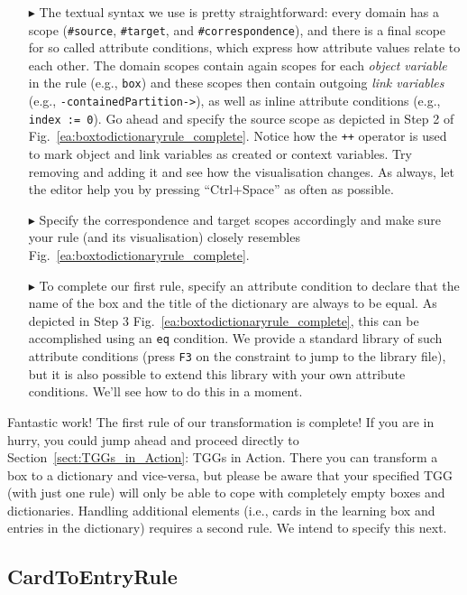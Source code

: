 \begin{enumerate}
\item[$\blacktriangleright$] The textual syntax we use is pretty straightforward:  every domain has a scope (\texttt{\#source}, \texttt{\#target}, and \texttt{\#correspondence}), and there is a final scope for so called attribute conditions, which express how attribute values relate to each other.
The domain scopes contain again scopes for each \emph{object variable} in the rule (e.g., \texttt{box}) and these scopes then contain outgoing \emph{link variables} (e.g., \texttt{-contained\-Partition->}), as well as inline attribute conditions (e.g., \texttt{index := 0}).
Go ahead and specify the source scope as depicted in Step 2 of Fig.~\ref{ea:boxtodictionaryrule_complete}.
Notice how the \texttt{++} operator is used to mark object and link variables as created or context variables.
Try removing and adding it and see how the visualisation changes.  
As always, let the editor help you by pressing ``Ctrl+Space'' as often as possible.

\item[$\blacktriangleright$] Specify the correspondence and target scopes accordingly and make sure your rule (and its visualisation) closely resembles Fig.~\ref{ea:boxtodictionaryrule_complete}.

\item[$\blacktriangleright$] To complete our first rule, specify an attribute condition to declare that the name of the box and the title of the dictionary are always to be equal.
As depicted in Step 3 Fig.~\ref{ea:boxtodictionaryrule_complete}, this can be accomplished using an \texttt{eq} condition.
We provide a standard library of such attribute conditions (press \texttt{F3} on the constraint to jump to the library file), but it is also possible to extend this library with your own attribute conditions.
We'll see how to do this in a moment.
\end{enumerate}

Fantastic work! The first rule of our transformation is complete! 
If you are in hurry, you could jump ahead and proceed directly to Section~\ref{sect:TGGs_in_Action}: TGGs in Action. 
There you can transform a box to a dictionary and vice-versa, but please be aware that your specified TGG (with just one rule) will only be able to cope with completely empty boxes and dictionaries. 
Handling additional elements (i.e., cards in the learning box and entries in the dictionary) requires a second rule.
We intend to specify this next.

\subsection{CardToEntryRule}

